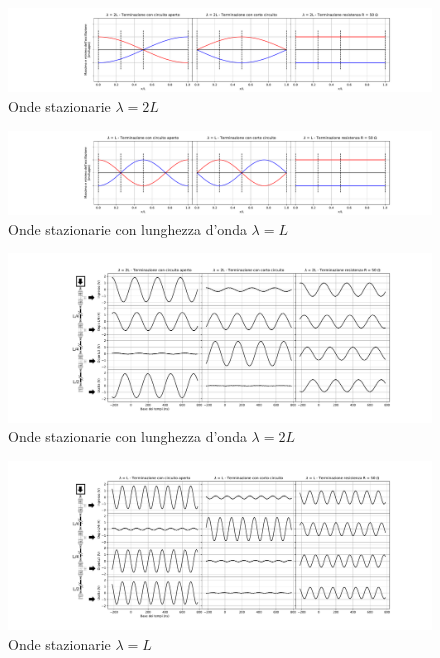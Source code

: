 \documentclass[journal]{IEEEtran}
\begin{document}
\begin{figure}[h]%
\centering
\begin{center}
\includegraphics[trim = {200pt 0 0 0}, width=1.1\textwidth]{analysis/output/Delay_line_standingWave2L.pdf}
\caption{Onde stazionarie $\lambda = 2L$}
\label{fig: "onde staz 2L}
\end{center}
\end{figure}

\begin{figure}[h]%
\centering
\begin{center}
\includegraphics[trim = {200pt 0 0 0}, width=1.1\textwidth]{analysis/output/Delay_line_standingWaveL.pdf}
\caption{Onde stazionarie con lunghezza d'onda $\lambda = L$}
\label{fig: onde staz L}
\end{center}
\end{figure}


\begin{figure}[h]%
\includegraphics[trim = {200pt 0 0 0}, clip, width=1.1\textwidth]{analysis/output/Delay_line_lambda2L.pdf}
\caption{Onde stazionarie con lunghezza d'onda $\lambda = 2L$}
\label{fig: delayline 2L}

\end{figure}

\begin{figure}[h]%
\includegraphics[trim = {200pt 0 0 0}, clip, width=1.1\textwidth]{analysis/output/Delay_line_lambdaL.pdf}
\caption{Onde stazionarie $\lambda = L$}
\label{fig: delayline L}
\end{figure}
\end{document}

